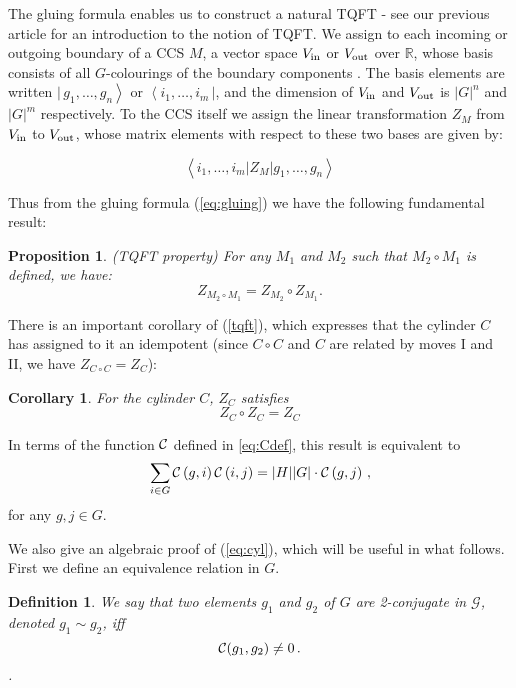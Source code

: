 \documentclass[a4paper,11pt]{article}
\newtheorem{Definition}[Theorem]{Definition}
\newtheorem{Proposition}[Theorem]{Proposition}
\newtheorem{Corollary}[Theorem]{Corollary}
\def \G {\mathcal{G}}
\begin{document}
The gluing formula enables us to construct a natural TQFT - see our previous article \cite{bp1} for an introduction to the notion of TQFT. We assign to each incoming or outgoing boundary of a CCS $M$, a vector space $V_{\rm in}$ or $V_{\rm out}$ over $\mathbb{R}$, whose basis consists of all $G$-colourings of the boundary components \cite{bp1}. The basis elements are written $|\,g_1,\dots , g_n  \left. \right \rangle$ or  
$\left \langle \right. i_1,\dots , i_m\,  |$, and the dimension of $V_{\rm in}$ and $V_{\rm out}$ is $|G|^n$ and $|G|^m$ respectively. To the CCS itself we assign the linear transformation $Z_M$ from $V_{\rm in}$ to $V_{\rm out}$, whose matrix elements with respect to these two bases are given by:

$$
 \left \langle i_1,\dots , i_m \left | Z_M \right |g_1,\dots , g_n   \right \rangle
$$

Thus from the gluing formula (\ref{eq:gluing}) we have the following fundamental result:
\begin{Proposition} (TQFT property) For any $M_1$ and $M_2$ such that $M_2\circ M_1$ is defined, we have:
\begin{equation}
Z_{M_2\circ M_1} = Z_{M_2} \circ Z_{M_1}.
\label{tqft}
\end{equation}
\end{Proposition}

There is an important corollary of (\ref{tqft}), which expresses that the cylinder $C$ has assigned to it an idempotent (since $C\circ C$ and $C$ are related by moves I and II, we have 
$Z_{C\circ C} =Z_C$):
\begin{Corollary} For the cylinder $C$, $Z_C$ satisfies
$$
Z_C \circ Z_C = Z_C 
$$
\end{Corollary}


In terms of the function ${\cal C}$ defined in \eqref{eq:Cdef}, this result is equivalent to
\begin{equation}
\sum_{i \in G} {\cal C} \left(g,i\right) {\cal C} \left(i,j\right)  = |H| |G| \cdot {\cal C} \left(g,j\right)\, ,
\label{eq:cyl}
\end{equation}
for any $g,j\in G$.



We also give an algebraic proof of (\ref{eq:cyl}), which will be useful in what follows. First we define an equivalence relation in $G$.
\begin{Definition} 
We say that two elements $g_1$ and $g_2$ of $G$ are 2-conjugate in $\G$, denoted $g_1 \sim g_2 $, iff 
$$
{\cal C}(g_1,g_2)\neq 0 \, .
$$.
\end{Definition}
\end{document}

